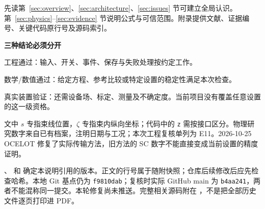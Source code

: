 \documentclass[UTF8,fontset=fandol,11pt,a4paper]{ctexart}
\begin{document}
先读第~\ref{sec:overview}、\ref{sec:architecture}、\ref{sec:issues} 节可建立全局认识。第~\ref{sec:physics}--\ref{sec:evidence} 节说明公式与可信范围。附录提供文献、证据编号、关键代码原行号及源码索引。
\begin{plainbox}
\textbf{三种结论必须分开}\par
工程通过：输入、开关、事件、保存与失败处理按约定工作。\par
数学/数值通过：给定方程、参考比较或特定设置的稳定性满足本次检查。\par
真实装置验证：还需设备场、标定、测量及不确定度。当前项目没有覆盖任意设置的这一级资格。
\end{plainbox}
文中 $s$ 专指束线位置，$\zeta$ 专指束内纵向坐标；代码中的 \texttt{z} 需按接口区分。物理研究数字来自已有档案，注明日期与工况；本次工程复核单列为 E11。2026-10-25 OCELOT 修复了实际传输方法，旧方法的 SC 数字不能直接变成当前设置的精度证明。

、 和  确定本说明引用的版本。正文的行号属于随附快照；仓库后续修改后应先检查哈希。本地 Git 基点仍为 \texttt{f9810dab}；复核时实际 GitHub main 为 \texttt{b4aa241}，两者不能混称同一提交。本轮修复尚未推送。完整相关源码附在 ，不是把全部历史文件逐页打印进 PDF。
\clearpage
\begingroup\small\setlength{\parskip}{0pt}\linespread{1.02}\selectfont
\tableofcontents\endgroup
\clearpage{}


\clearpage\appendix

\end{document}
